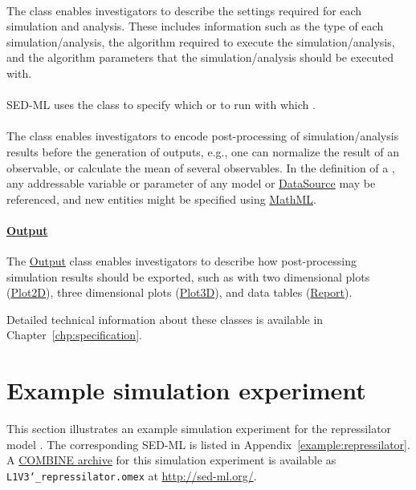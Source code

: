 \paragraph*{\Simulation}
The \Simulation class enables investigators to describe the settings required for each simulation and analysis. These includes information such as the type of each simulation/analysis, the algorithm required to execute the simulation/analysis, and the algorithm parameters that the simulation/analysis should be executed with.

\paragraph*{\AbstractTask}
SED-ML uses the \AbstractTask class to specify which \Simulation or \FitExperiment to run with which \Model.

\paragraph*{\DataGenerator}
The \DataGenerator class enables investigators to encode post-processing of simulation/analysis results before the generation of outputs, e.g., one can normalize the result of an observable, or calculate the mean of several observables. In the definition of a \DataGenerator, any addressable variable or parameter of any model or \hyperref[class:dataSource]{DataSource} may be referenced, and new entities might be specified using \hyperref[sec:mathML]{MathML}.

\paragraph*{\hyperref[class:output]{Output}}
The \hyperref[class:output]{Output} class enables investigators to describe how post-processing simulation results should be exported, such as with two dimensional plots (\hyperref[class:plot2D]{Plot2D}), three dimensional plots (\hyperref[class:plot3D]{Plot3D}), and data tables (\hyperref[class:report]{Report}).

Detailed technical information about these classes is available in Chapter~\ref{chp:specification}. 

\section{Example simulation experiment}
\label{motivation:example}
This section illustrates an example simulation experiment for the repressilator model \citep{Elowitz:2000}. The corresponding SED-ML is listed in Appendix~\ref{example:repressilator}. A \hyperref[sec:archive]{COMBINE archive} for this simulation experiment is available as \texttt{L1V3\char`_repressilator.omex} at \url{http://sed-ml.org/}.

